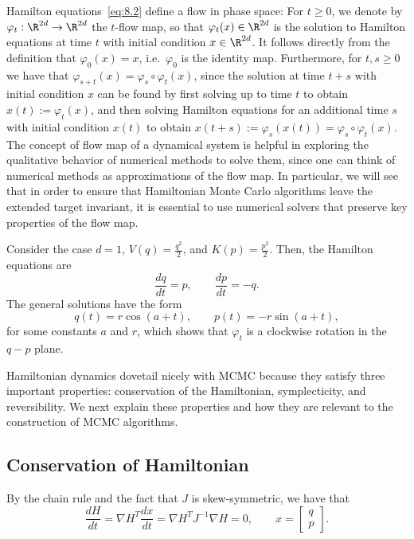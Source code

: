Hamilton equations~\eqref{eq:8.2} define a flow in phase space: For $t \ge 0$, we denote by
$\varphi_t : \R^{2d} \to \R^{2d}$ the $t$-flow map, so that $\varphi_t(x) \in \R^{2d}$ is
the solution to Hamilton equations at time $t$ with initial condition $x \in \R^{2d}$. It
follows directly from the definition that $\varphi_0(x) = x$, i.e.\ $\varphi_0$ is the
identity map. Furthermore, for $t, s \ge 0$ we have that $\varphi_{s+t}(x) = \varphi_s \circ
\varphi_t(x)$, since the solution at time $t + s$ with initial condition $x$ can be found by
first solving up to time $t$ to obtain $x(t) := \varphi_t(x)$, and then solving Hamilton
equations for an additional time $s$ with initial condition $x(t)$ to obtain
$x(t+s) := \varphi_s(x(t)) = \varphi_s \circ \varphi_t(x)$. The concept of flow map of a
dynamical system is helpful in exploring the qualitative behavior of numerical methods to solve
them, since one can think of numerical methods as approximations of the flow map. In particular,
we will see that in order to ensure that Hamiltonian Monte Carlo algorithms leave the extended
target invariant, it is essential to use numerical solvers that preserve key properties of the
flow map.

\begin{example}
Consider the case $d = 1$, $V(q) = \frac{q^2}{2}$, and $K(p) = \frac{p^2}{2}$. Then, the
Hamilton equations are
\[
\frac{dq}{dt} = p, \qquad \frac{dp}{dt} = -q.
\]
The general solutions have the form
\[
q(t) = r\cos(a + t), \qquad p(t) = -r\sin(a + t),
\]
for some constants $a$ and $r$, which shows that $\varphi_t$ is a clockwise rotation in the
$q-p$ plane.
\end{example}

Hamiltonian dynamics dovetail nicely with MCMC because they satisfy three important properties:
conservation of the Hamiltonian, symplecticity, and reversibility. We next explain these
properties and how they are relevant to the construction of MCMC algorithms.

\subsection{Conservation of Hamiltonian}
\label{sec:8.1.1}

By the chain rule and the fact that $J$ is skew-symmetric, we have that
\[
\frac{dH}{dt} = \nabla H^T \frac{dx}{dt} = \nabla H^T J^{-1} \nabla H = 0, \qquad
x = \begin{bmatrix}q\\p\end{bmatrix}.
\]

